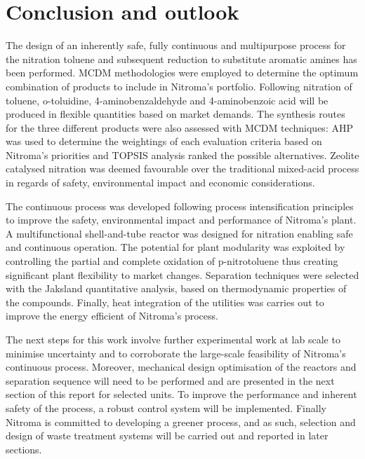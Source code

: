 \section{Conclusion and outlook}

The design of an inherently safe, fully continuous and multipurpose process for the nitration toluene and subsequent reduction to substitute aromatic amines has been performed. MCDM methodologies were employed to determine the optimum combination of products to include in Nitroma's portfolio. Following nitration of toluene, o-toluidine, 4-aminobenzaldehyde and 4-aminobenzoic acid will be produced in flexible quantities based on market demands. The synthesis routes for the three different products were also assessed with MCDM techniques: AHP was used to determine the weightings of each evaluation criteria based on Nitroma's priorities and TOPSIS analysis ranked the possible alternatives. Zeolite catalysed nitration was deemed favourable over the traditional mixed-acid process in regards of safety, environmental impact and economic considerations. 

The continuous process was developed following process intensification principles to improve the safety, environmental impact and performance of Nitroma's plant. A multifunctional shell-and-tube reactor was designed for nitration enabling safe and continuous operation. The potential for plant modularity was exploited by controlling the partial and complete oxidation of p-nitrotoluene thus creating significant plant flexibility to market changes. Separation techniques were selected with the Jaksland quantitative analysis, based on thermodynamic properties of the compounds. Finally, heat integration of the utilities was carries out to improve the energy efficient of Nitroma's process.

The next steps for this work involve further experimental work at lab scale to minimise uncertainty and to corroborate the large-scale feasibility of Nitroma's continuous process. Moreover, mechanical design optimisation of the reactors and separation sequence will need to be performed and are presented in the next section of this report for selected units. To improve the performance and inherent safety of the process, a robust control system will be implemented. Finally Nitroma is committed to developing a greener process, and as such, selection and design of waste treatment systems will be carried out and reported in later sections.

